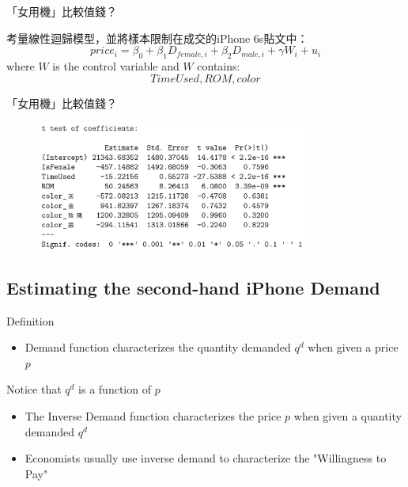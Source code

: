 \documentclass[11pt]{beamer}
\begin{document}
\begin{frame}[fragile]{「女用機」比較值錢？}

考量線性迴歸模型，並將樣本限制在成交的iPhone 6s貼文中：
$$price_i = \beta_0 + \beta_1 D_{female, i} + \beta_2 D_{male, i} + \gamma W_i + u_i$$
where $W$ is the control variable and $W$ contains: $$TimeUsed, ROM, color$$

\end{frame}


\begin{frame}[fragile]{「女用機」比較值錢？}

	\begin{figure}
		\begin{center}
			\includegraphics[width=0.8\textwidth]{figure/f02.png}
		\end{center}
	\end{figure}

\end{frame}


\subsection{Estimating the second-hand iPhone Demand}

\begin{frame}[fragile]{Definition}

	\begin{itemize}
		\item Demand function characterizes the quantity demanded $q^d$ when given a price $p$
	\end{itemize}
	Notice that $q^d$ is a function of $p$

	\begin{itemize}
		\item The Inverse Demand function characterizes the price $p$ when given a quantity demanded $q^d$
		\item Economists usually use inverse demand to characterize the "Willingness to Pay"
	\end{itemize}

\end{frame}
\end{document}
